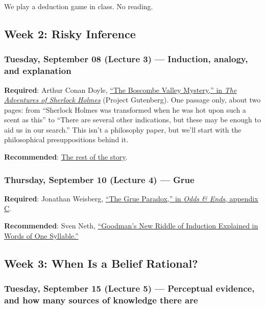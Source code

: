 \documentclass[
  letterpaper,
  DIV=11,
  numbers=noendperiod]{scrartcl}
\begin{document}
We play a deduction game in class. No reading.

\subsection{Week 2: Risky Inference}\label{week-2-risky-inference}

\subsubsection{Tuesday, September 08 (Lecture 3) --- Induction, analogy,
and
explanation}\label{tuesday-september-08-lecture-3-induction-analogy-and-explanation}

\textbf{Required}: Arthur Conan Doyle,
\href{https://www.gutenberg.org/ebooks/1661}{``The Boscombe Valley
Mystery,'' in \emph{The Adventures of Sherlock Holmes}} (Project
Gutenberg). One passage only, about two pages: from ``Sherlock Holmes
was transformed when he was hot upon such a scent as this'' to ``There
are several other indications, but these may be enough to aid us in our
search.'' This isn't a philosophy paper, but we'll start with the
philosophical presuppositions behind it.

\textbf{Recommended}: \href{https://www.gutenberg.org/ebooks/1661}{The
rest of the story}.

\subsubsection{Thursday, September 10 (Lecture 4) ---
Grue}\label{thursday-september-10-lecture-4-grue}

\textbf{Required}: Jonathan Weisberg,
\href{https://jonathanweisberg.org/vip/grue.html}{``The Grue Paradox,''
in \emph{Odds \& Ends}, appendix C}.

\textbf{Recommended}: Sven Neth,
\href{https://philpapers.org/archive/NETGNR.pdf}{``Goodman's New Riddle
of Induction Explained in Words of One Syllable.''}

\subsection{Week 3: When Is a Belief
Rational?}\label{week-3-when-is-a-belief-rational}

\subsubsection{Tuesday, September 15 (Lecture 5) --- Perceptual
evidence, and how many sources of knowledge there
are}\label{tuesday-september-15-lecture-5-perceptual-evidence-and-how-many-sources-of-knowledge-there-are}
\end{document}
